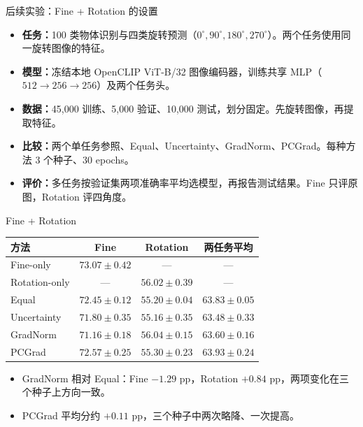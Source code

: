 \documentclass[UTF8,aspectratio=169,10pt]{ctexbeamer}
\begin{document}
\begin{frame}{后续实验：Fine + Rotation 的设置}
\begin{itemize}\setlength{\itemsep}{7pt}
\item \textbf{任务：}100 类物体识别与四类旋转预测（$0^\circ,90^\circ,180^\circ,270^\circ$）。两个任务使用同一旋转图像的特征。
\item \textbf{模型：}冻结本地 OpenCLIP ViT-B/32 图像编码器，训练共享 MLP（$512\to256\to256$）及两个任务头。
\item \textbf{数据：}45,000 训练、5,000 验证、10,000 测试，划分固定。先旋转图像，再提取特征。
\item \textbf{比较：}两个单任务参照、Equal、Uncertainty、GradNorm、PCGrad。每种方法 3 个种子、30 epochs。
\item \textbf{评价：}多任务按验证集两项准确率平均选模型，再报告测试结果。Fine 只评原图，Rotation 评四角度。
\end{itemize}
\end{frame}

\begin{frame}{Fine + Rotation}
\begin{center}
\begin{tabular}{lccc}
\toprule
方法 & Fine & Rotation & 两任务平均\\
\midrule
Fine-only & $73.07\pm0.42$ & --- & ---\\
Rotation-only & --- & $56.02\pm0.39$ & ---\\
Equal & $72.45\pm0.12$ & $55.20\pm0.04$ & $63.83\pm0.05$\\
Uncertainty & $71.80\pm0.35$ & $55.16\pm0.35$ & $63.48\pm0.33$\\
GradNorm & $71.16\pm0.18$ & $56.04\pm0.15$ & $63.60\pm0.16$\\
PCGrad & $72.57\pm0.25$ & $55.30\pm0.23$ & $63.93\pm0.24$\\
\bottomrule
\end{tabular}
\end{center}
\normalsize
\begin{itemize}\setlength{\itemsep}{6pt}
\item GradNorm 相对 Equal：Fine $-1.29$ pp，Rotation $+0.84$ pp，两项变化在三个种子上方向一致。
\item PCGrad 平均分约 $+0.11$ pp，三个种子中两次略降、一次提高。
\end{itemize}
\end{frame}
\end{document}
